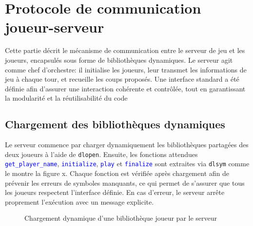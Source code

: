 \section{Protocole de communication joueur-serveur}
\label{sec:part-khaoula}
Cette partie décrit le mécanisme de communication entre le serveur de jeu et les joueurs, encapsulés sous forme de bibliothèques dynamiques. Le serveur agit comme chef d’orchestre: il initialise les joueurs, leur transmet les informations de jeu à chaque tour, et recueille les coups proposés. Une interface standard a été définie afin d’assurer une interaction cohérente et contrôlée, tout en garantissant la modularité et la réutilisabilité du code
\subsection{Chargement des bibliothèques dynamiques}
Le serveur commence par charger dynamiquement les bibliothèques partagées des deux joueurs à l’aide de \texttt{dlopen}. Ensuite, les fonctions attendues \texttt{\textcolor{blue}{get\_player\_name}}, \texttt{\textcolor{blue}{initialize}}, \texttt{\textcolor{blue}{play}} et \texttt{\textcolor{blue}{finalize}} sont extraites via \texttt{dlsym} comme le montre la figure x. Chaque fonction est vérifiée après chargement afin de prévenir les erreurs de symboles manquants, ce qui permet de s’assurer que tous les joueurs respectent l’interface définie. En cas d’erreur, le serveur arrête proprement l’exécution avec un message explicite.



\vspace{0.5cm}
\begin{figure}[H]
\centering
{}
\caption{Chargement dynamique d'une bibliothèque joueur par le serveur}
\label{fig:dlopen}
\end{figure}

